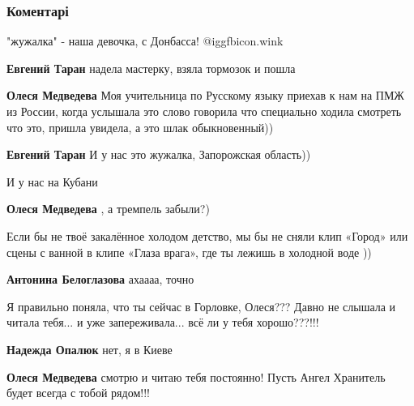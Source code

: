  
 
 
 
 
\subsubsection{Коментарі}
\label{sec:18_11_2021.fb.medvedeva_olesja.1.donbass_detstvo.cmt}

\begin{itemize} %
"жужалка" - наша девочка, с Донбасса!  @igg{fbicon.wink} 

\begin{itemize} %
\textbf{Евгений Таран} надела мастерку, взяла тормозок и пошла

\textbf{Олеся Медведева} Моя учительница по Русскому языку приехав к нам на ПМЖ из России, когда услышала это слово говорила что специально ходила смотреть что это, пришла увидела, а это шлак обыкновенный))

\textbf{Евгений Таран} И у нас это жужалка, Запорожская область))

И у нас на Кубани

\textbf{Олеся Медведева} , а тремпель забыли?)
\end{itemize} %


Если бы не твоё закалённое холодом детство, мы бы не сняли клип «Город» или
сцены с ванной в клипе «Глаза врага», где ты лежишь в холодной воде ))

\textbf{Антонина Белоглазова} ахаааа, точно


Я правильно поняла, что ты сейчас в Горловке, Олеся???
Давно не слышала и читала тебя... и уже запереживала... всё ли у тебя хорошо???!!!

\begin{itemize} %
\textbf{Надежда Опалюк} нет, я в Киеве

\textbf{Олеся Медведева} смотрю и читаю тебя постоянно!
Пусть Ангел Хранитель будет всегда с тобой рядом!!!



\end{itemize}
\end{itemize}
